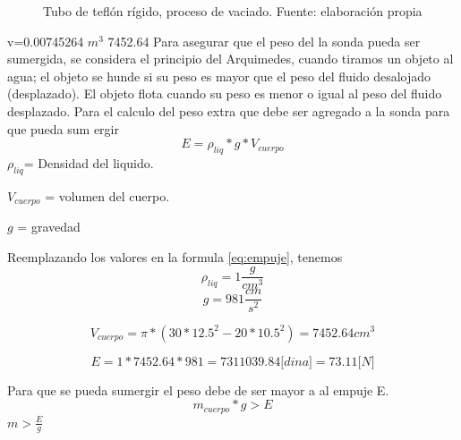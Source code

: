 \begin{figure}[ht]
\centering
{}
\caption{Tubo de tefl\'on r\'igido, proceso de vaciado. Fuente: elaboración propia}
\label{fig:preparacion_vaciado}
\end{figure}

v=0.00745264 $m^3$
7452.64
Para asegurar que el peso del la sonda pueda ser sumergida, se considera el principio del Arquimedes, cuando tiramos un objeto al agua; el objeto se hunde si su peso es mayor que el peso del fluido desalojado (desplazado). El objeto flota cuando su peso es menor o igual al peso del fluido desplazado. 
Para el calculo del peso extra que debe ser agregado a la sonda para que pueda sum ergir 
\begin{equation}
E=\rho_{liq}*g*V_{cuerpo} 
\label{eq:empuje}
\end{equation}
$\rho_{liq}$= Densidad del liquido.

$V_{cuerpo}$ = volumen del cuerpo.

$g$ = gravedad

Reemplazando los valores en la formula \ref{eq:empuje}, tenemos
$$ \rho_{liq} = 1 \frac{g}{cm^{3}}$$  
$$ g= 981 \frac{cm}{s^{2}}$$

$$ V_{cuerpo}= \pi * (30*12.5^{2}-20*10.5^{2})= 7452.64 cm^{3}$$

$$ E= 1 * 7452.64 * 981 = 7311039.84 \textit{[dina]} = 73.11 \textit{[N]}$$

Para que se pueda sumergir el peso debe de ser mayor a al empuje E.
\begin{equation}
m_{cuerpo} * g > E 
\label{eq:empuje2}
\end{equation}
$m >\frac{E}{g}$

